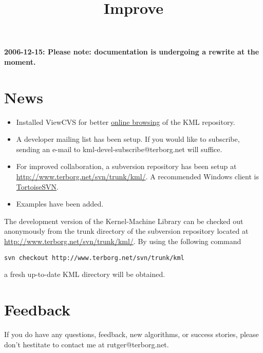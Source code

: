 \documentclass{article}
\begin{document}
\title{Improve}
\maketitle

\textbf{2006-12-15: Please note: documentation is undergoing a rewrite at the moment.}

\section*{News}

\begin{itemize}

\item Installed ViewCVS for better 
\href{http://www.terborg.net/cgi-bin/viewcvs.cgi/trunk/kml/}{online browsing}
of the KML repository.
\item A developer mailing list has been setup. If you would like to subscribe, sending an
e-mail to kml-devel-subscribe@terborg.net will suffice.
\item For improved collaboration, a subversion repository has been 
setup at \href{http://www.terborg.net/svn/trunk/kml/}{http://www.terborg.net/svn/trunk/kml/}. A
recommended Windows client is \href{http://tortoisesvn.tigris.org/}{TortoiseSVN}.
\item Examples have been added.

\end{itemize}


The development version of the Kernel-Machine Library can be checked out anonymously from 
the trunk directory of the subversion repository located at 
\href{http://www.terborg.net/svn/trunk/kml/}{http://www.terborg.net/svn/trunk/kml/}. By using the following command
\begin{verbatim}
svn checkout http://www.terborg.net/svn/trunk/kml
\end{verbatim}
a fresh up-to-date KML directory will be obtained. 


\section*{Feedback}

If you do have any questions, feedback, new algorithms, or success stories, 
please don't hestitate to contact me at rutger@terborg.net.




\end{document}
